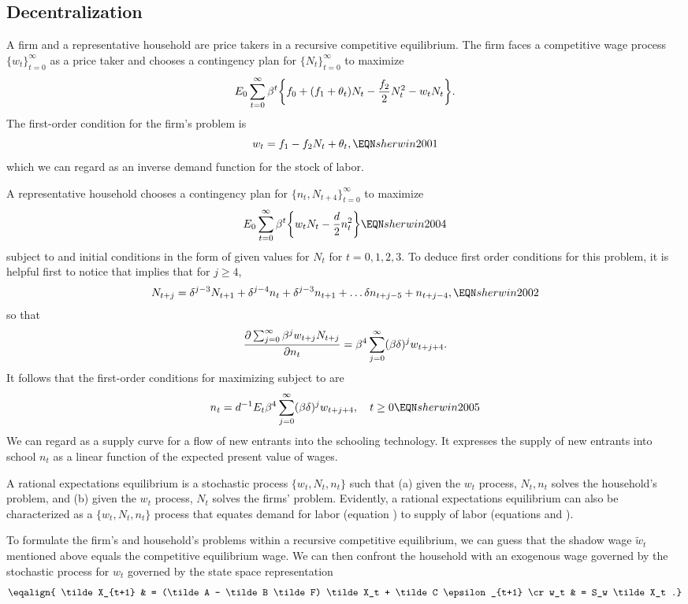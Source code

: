 \subsection{Decentralization}

A firm and a representative household are price takers in a recursive competitive equilibrium. The firm faces a competitive wage process
$\{w_t\}_{t=0}^\infty$ as a price taker and chooses a contingency plan for $\{N_t\}_{t=0}^\infty$ to maximize
$$ E_0 \sum_{t=0}^\infty \beta^t \biggl\{ f_0 + (f_1 + \theta_t) N_t - {f_2 \over 2} N_t^2 - w_t N_t \biggr\}. $$
The first-order condition for the firm's problem is
$$ w_t = f_1 - f_2 N_t + \theta_t ,  \EQN sherwin2001$$
which we can regard as an inverse demand function for the stock of labor.


A representative household chooses a contingency plan for $\{n_t, N_{t+4}\}_{t=0}^\infty$ to maximize
$$ E_0 \sum_{t=0}^\infty \beta^t \biggl\{ w_t N_t - {d \over 2} n_t^2 \biggr\}  \EQN sherwin2004 $$
subject to  and initial conditions in the form of given values for $N_t$ for $t = 0, 1, 2, 3$.
To deduce  first order  conditions for this problem, it is helpful first to notice that  implies
that for $j \geq 4$,
$$ N_{t+j} = \delta^{j-3} N_{t+1} + \delta^{j-4} n_t + \delta^{j-3} n_{t+1} + \ldots \delta n_{t+j-5} + n_{t+j-4}, \EQN sherwin2002 $$
so that
$$ {\partial \sum_{j=0}^\infty \beta^j w_{t+j} N_{t+j} \over \partial n_t } = \beta^4 \sum_{j=0}^\infty (\beta \delta)^j w_{t+j+4} .$$
It follows that the first-order conditions for maximizing  subject to  are
$$ n_t = d^{-1} E_t \beta^4 \sum_{j=0}^\infty (\beta \delta)^j w_{t+j+4}, \quad t \geq 0 \EQN sherwin2005 $$
We can regard  as a supply curve for a flow of new entrants into the schooling technology. It expresses the supply of new entrants into
school $n_t$
as a linear function of the expected present value of wages.

A rational expectations equilibrium is a stochastic process $\{w_t, N_t, n_t\}$ such that (a) given the $w_t$ process,
$N_t, n_t$ solves the household's problem, and (b) given the $w_t$ process, $N_t$ solves the firms' problem.
Evidently, a rational expectations equilibrium can also be characterized as a $\{w_t, N_t, n_t\}$ process
that equates  demand for labor (equation   ) to supply   of  labor (equations  and ).

To formulate the firm's and household's problems  within a recursive competitive equilibrium, we can guess that the shadow wage $\tilde w_t$ mentioned above equals the
competitive equilibrium wage.  We can then  confront the household with an exogenous
wage governed by the stochastic process for $w_t$ governed
by
the state space representation
$$ \eqalign{ \tilde X_{t+1} & = (\tilde A - \tilde B \tilde F) \tilde X_t + \tilde C \epsilon_{t+1} \cr
                    w_t & = S_w \tilde X_t .} $$

